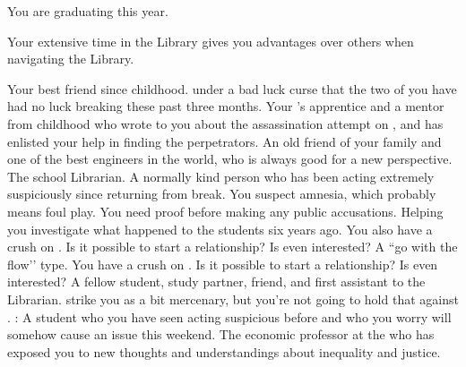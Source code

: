 \documentclass[char]{GL2020}
\begin{document}
\begin{itemz}[Notes]
    \item You are graduating this year.
    \item Your extensive time in the Library gives you advantages over others when navigating the Library.
\end{itemz}

\begin{contacts}
    \contact{\cInitiate{}} Your best friend since childhood. \cInitiate{\They} \cInitiate{\are} under a bad luck curse that the two of you have had no luck breaking these past three months.
    \contact{\cJuniorStatesman{}} Your \cHeadDiplomat{\Auncle} \cHeadDiplomat{}'s apprentice and a mentor from childhood who wrote to you about the assassination attempt on \cHeadDiplomat{}, and has enlisted your help in finding the perpetrators.   
    \contact {\cBunker{}} An old friend of your family and one of the best engineers in the world, who is always good for a new perspective.
    \contact{\cLibrarian{}} The school Librarian. A normally kind person who has been acting extremely suspiciously since returning from break. You suspect amnesia, which probably means foul play. You need proof before making any public accusations.
    \contact{\cHeir{}} Helping you investigate what happened to the students six years ago. You also have a crush on \cHeir{\them}. Is it possible to start a relationship? Is \cHeir{} even interested?
    \contact{\cChupStudent{}} A ``go with the flow’’ type. You have a crush on \cChupStudent{\them}. Is it possible to start a relationship? Is \cChupStudent{} even interested?
    \contact{\cLibAssist{}} A fellow student, study partner, friend, and first assistant to the Librarian. \cLibAssist{\They} strike\cLibAssist{\verbs} you as a bit mercenary, but you're not going to hold that against \cLibAssist{\them}.
\contact{\cPirateChild{}}: A \pShippie{} student who you have seen acting suspicious before and who you worry will somehow cause an issue this weekend.  
    \contact{\cChupSecond{}} The economic professor at the \pSchool{} who has exposed you to new thoughts and understandings about inequality and justice.

\end{contacts}
\end{document}
